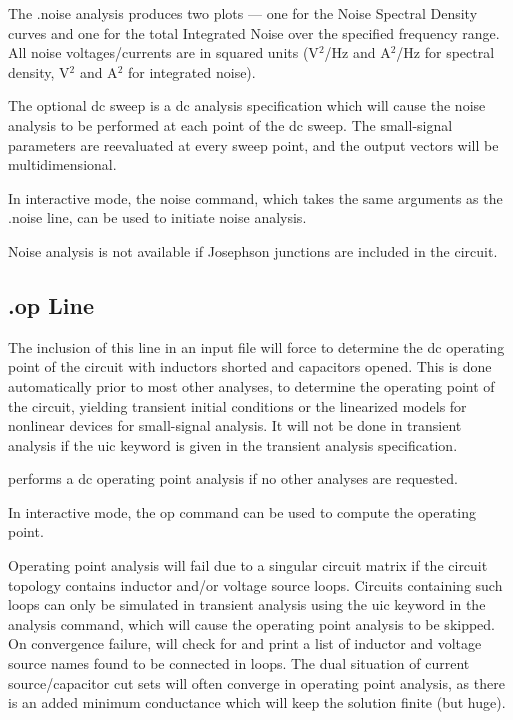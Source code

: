 The {\vt .noise} analysis produces two plots --- one for the Noise
Spectral Density curves and one for the total Integrated Noise over
the specified frequency range.  All noise voltages/currents are in
squared units (V$^2$/Hz and A$^2$/Hz for spectral density, V$^2$ and
A$^2$ for integrated noise).

The optional dc sweep is a dc analysis specification which will cause
the noise analysis to be performed at each point of the dc sweep.  The
small-signal parameters are reevaluated at every sweep point, and the
output vectors will be multidimensional.

In interactive mode, the {\cb noise} command, which takes the same
arguments as the {\vt .noise} line, can be used to initiate noise
analysis.

Noise analysis is not available if Josephson junctions are
included in the circuit.

\subsection{{\vt .op} Line}
\label{opline}


The inclusion of this line in an input file will force {\WRspice} to
determine the dc operating point of the circuit with inductors shorted
and capacitors opened.  This is done automatically prior to most other
analyses, to determine the operating point of the circuit, yielding
transient initial conditions or the linearized models for nonlinear
devices for small-signal analysis.  It will not be done in transient
analysis if the {\vt uic} keyword is given in the transient analysis
specification.

{\WRspice} performs a dc operating point analysis if no other analyses
are requested.

In interactive mode, the {\cb op} command can be used to compute
the operating point.

Operating point analysis will fail due to a singular circuit matrix if
the circuit topology contains inductor and/or voltage source loops. 
Circuits containing such loops can only be simulated in transient
analysis using the {\vt uic} keyword in the analysis command, which
will cause the operating point analysis to be skipped.  On convergence
failure, {\WRspice} will check for and print a list of inductor and
voltage source names found to be connected in loops.  The dual
situation of current source/capacitor cut sets will often converge in
operating point analysis, as there is an added minimum conductance
which will keep the solution finite (but huge).

